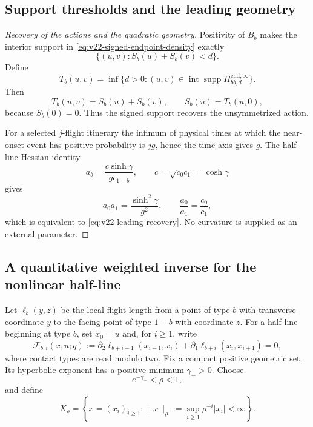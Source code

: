 \subsection{Support thresholds and the leading geometry}

\begin{proof}[Recovery of the actions and the quadratic geometry]
Positivity of $B_b$ makes the interior support in
\eqref{eq:v22-signed-endpoint-density} exactly
\[
                  \{(u,v):S_b(u)+S_b(v)<d\}.
\]
Define
\[
 T_b(u,v)=\inf\{d>0:(u,v)\in
       \operatorname{int}\operatorname{supp}
       \Pi^{\mathrm{end},\infty}_{bb,d}\}.
\]
Then
\begin{equation}\label{eq:v22-support-threshold}
             T_b(u,v)=S_b(u)+S_b(v),\qquad S_b(u)=T_b(u,0),
\end{equation}
because $S_b(0)=0$.  Thus the signed support recovers the unsymmetrized
action.

For a selected $j$-flight itinerary the infimum of physical times at which
the near-onset event has positive probability is $jg$, hence the time axis
gives $g$.  The half-line Hessian identity
\[
 a_b=\frac{c\sinh\gamma}{gc_{1-b}},
 \qquad c=\sqrt{c_0c_1}=\cosh\gamma
\]
gives
\[
 a_0a_1=\frac{\sinh^2\gamma}{g^2},
 \qquad \frac{a_0}{a_1}=\frac{c_0}{c_1},
\]
which is equivalent to \eqref{eq:v22-leading-recovery}.  No curvature is
supplied as an external parameter.
\end{proof}

\subsection{A quantitative weighted inverse for the nonlinear half-line}

Let $\ell_b(y,z)$ be the local flight length from a point of type $b$ with
transverse coordinate $y$ to the facing point of type $1-b$ with coordinate
$z$.  For a half-line beginning at type $b$, set $x_0=u$ and, for $i\ge1$,
write
\begin{equation}\label{eq:v22-stationary-equations}
 \mathscr F_{b,i}(x,u;q)
 :=\partial_2\ell_{b+i-1}(x_{i-1},x_i)
  +\partial_1\ell_{b+i}(x_i,x_{i+1})=0,
\end{equation}
where contact types are read modulo two.  Fix a compact positive geometric
set.  Its hyperbolic exponent has a positive minimum $\gamma_->0$.  Choose
\begin{equation}\label{eq:v22-rho-choice}
                     e^{-\gamma_-}<\rho<1,
\end{equation}
and define
\[
 X_\rho=\left\{x=(x_i)_{i\ge1}:
       \|x\|_\rho:=\sup_{i\ge1}\rho^{-i}|x_i|<\infty\right\}.
\]

